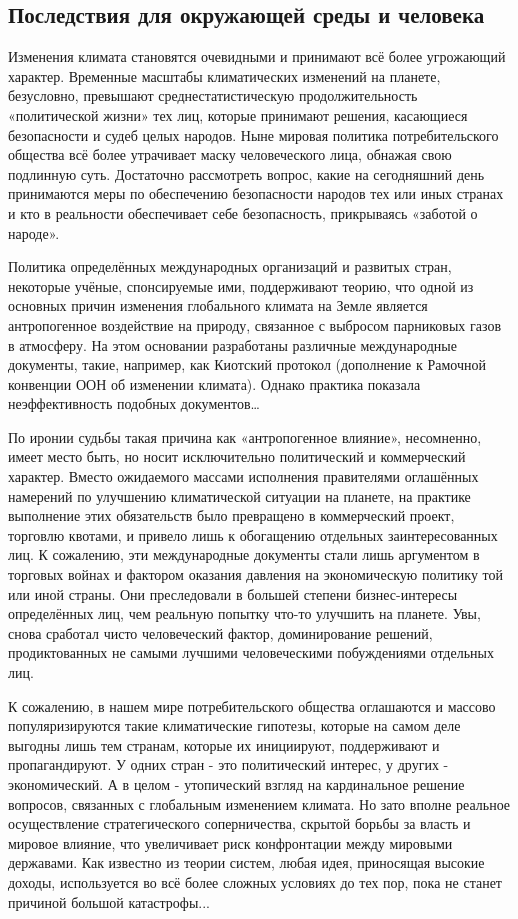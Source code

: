 \documentclass[a5paper,10pt]{article}
\begin{document}
		\subsection{Последствия для окружающей среды и человека}
			Изменения климата становятся очевидными и принимают всё более угрожающий характер. Временные масштабы климатических изменений на планете, безусловно, превышают среднестатистическую продолжительность «политической жизни» тех лиц, которые принимают решения, касающиеся безопасности и судеб целых народов. Ныне мировая политика потребительского общества всё более утрачивает маску человеческого лица, обнажая свою подлинную суть. Достаточно рассмотреть вопрос, какие на сегодняшний день принимаются меры по обеспечению безопасности народов тех или иных странах и кто в реальности обеспечивает себе безопасность, прикрываясь «заботой о народе».

			Политика определённых международных организаций и развитых стран, некоторые учёные, спонсируемые ими, поддерживают теорию, что одной из основных причин изменения глобального климата на Земле является антропогенное воздействие на природу, связанное с выбросом парниковых газов в атмосферу. На этом основании разработаны различные международные документы, такие, например, как Киотский протокол (дополнение к Рамочной конвенции ООН об изменении климата). Однако практика показала неэффективность подобных документов…

			По иронии судьбы такая причина как «антропогенное влияние», несомненно, имеет место быть, но носит исключительно политический и коммерческий характер. Вместо ожидаемого массами исполнения правителями оглашённых намерений по улучшению климатической ситуации на планете, на практике выполнение этих обязательств было превращено в коммерческий проект, торговлю квотами, и привело лишь к обогащению отдельных заинтересованных лиц. К сожалению, эти международные документы стали лишь аргументом в торговых войнах и фактором оказания давления на экономическую политику той или иной страны. Они преследовали в большей степени бизнес-интересы определённых лиц, чем реальную попытку что-то улучшить на планете. Увы, снова сработал чисто человеческий фактор, доминирование решений, продиктованных не самыми лучшими человеческими побуждениями отдельных лиц.

			К сожалению, в нашем мире потребительского общества оглашаются и массово популяризируются такие климатические гипотезы, которые на самом деле выгодны лишь тем странам, которые их инициируют, поддерживают и пропагандируют. У одних стран - это политический интерес, у других - экономический. А в целом - утопический взгляд на кардинальное решение вопросов, связанных с глобальным изменением климата. Но зато вполне реальное осуществление стратегического соперничества, скрытой борьбы за власть и мировое влияние, что увеличивает риск конфронтации между мировыми державами. Как известно из теории систем, любая идея, приносящая высокие доходы, используется во всё более сложных условиях до тех пор, пока не станет причиной большой катастрофы...
\end{document}
